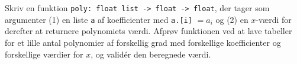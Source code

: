 Skriv en funktion \lstinline{poly: float list -> float -> float}, der tager som argumenter (1) en liste \lstinline{a} af koefficienter med \lstinline{a.[i]} $= a_i$ og (2) en $x$-værdi for derefter at returnere polynomiets værdi. Afprøv funktionen ved at lave tabeller for et lille antal polynomier af forskellig grad med forskellige koefficienter og forskellige værdier for $x$, og valid\'{e}r den beregnede værdi.
